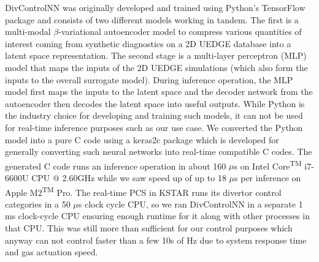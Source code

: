 DivControlNN was originally developed and trained using Python's TensorFlow package and consists of two different models working in tandem.
The first is a multi-modal $\beta$-variational autoencoder \cite{Higgins_2017_ICLR} model to compress various quantities of interest coming from synthetic diagnostics on a 2D UEDGE database into a latent space representation.
The second stage is a multi-layer perceptron (MLP) model that maps the inputs of the 2D UEDGE simulations (which also form the inputs to the overall surrogate model).
During inference operation, the MLP model first maps the inputs to the latent space and the decoder network from the autoencoder then decodes the latent space into useful outputs.
While Python is the industry choice for developing and training such models, it can not be used for real-time inference purposes such as our use case.
We converted the Python model into a pure C code using a keras2c \cite{keras2c} package which is developed for generally converting such neural networks into real-time compatible C codes.
The generated C code runs an inference operation in about 160 $\mu$s on Intel\textsuperscript{\textregistered} Core\textsuperscript{TM} i7-6600U CPU @ 2.60GHz while we saw speed up of up to 18 $\mu$s per inference on Apple\textsuperscript{\textregistered} M2\textsuperscript{TM} Pro.
The real-time PCS in KSTAR runs its divertor control categories in a 50 $\mu$s clock cycle CPU, so we ran DivControlNN in a separate 1 ms clock-cycle CPU ensuring enough runtime for it along with other processes in that CPU.
This was still more than sufficient for our control purposes which anyway can not control faster than a few 10s of Hz due to system response time and gas actuation speed.

